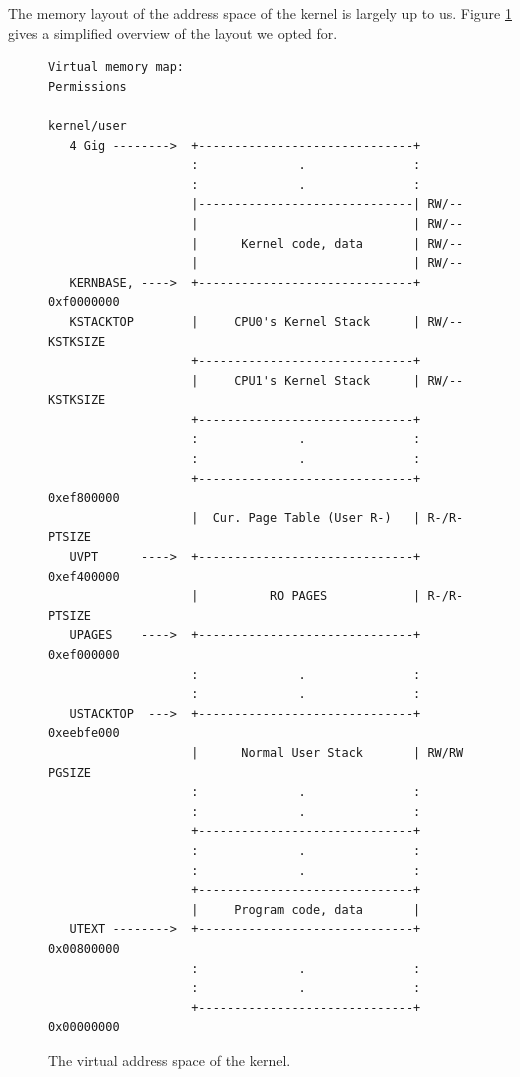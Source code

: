 \documentclass{report}
\begin{document}
The memory layout of the address space of the kernel is largely up to us.
Figure \ref{memlayout} gives a simplified overview of the layout we opted for.
\begin{figure}
\begin{framed}
\begin{Verbatim}[fontsize=\small]
Virtual memory map:                                  Permissions
                                                     kernel/user
   4 Gig -------->  +------------------------------+
                    :              .               :
                    :              .               :
                    |------------------------------| RW/--
                    |                              | RW/--
                    |      Kernel code, data       | RW/--
                    |                              | RW/--
   KERNBASE, ---->  +------------------------------+ 0xf0000000      
   KSTACKTOP        |     CPU0's Kernel Stack      | RW/--  KSTKSIZE 
                    +------------------------------+                 
                    |     CPU1's Kernel Stack      | RW/--  KSTKSIZE 
                    +------------------------------+                 
                    :              .               :                 
                    :              .               :                 
                    +------------------------------+ 0xef800000
                    |  Cur. Page Table (User R-)   | R-/R-  PTSIZE
   UVPT      ---->  +------------------------------+ 0xef400000
                    |          RO PAGES            | R-/R-  PTSIZE
   UPAGES    ---->  +------------------------------+ 0xef000000
                    :              .               :                 
                    :              .               :                 
   USTACKTOP  --->  +------------------------------+ 0xeebfe000
                    |      Normal User Stack       | RW/RW  PGSIZE
                    :              .               :                 
                    :              .               :                 
                    +------------------------------+
                    :              .               :
                    :              .               :
                    +------------------------------+
                    |     Program code, data       |
   UTEXT -------->  +------------------------------+ 0x00800000
                    :              .               :                 
                    :              .               :                 
                    +------------------------------+ 0x00000000
\end{Verbatim}
\end{framed}
\caption{The virtual address space of the kernel.}
\label{memlayout}
\end{figure}
\end{document}

